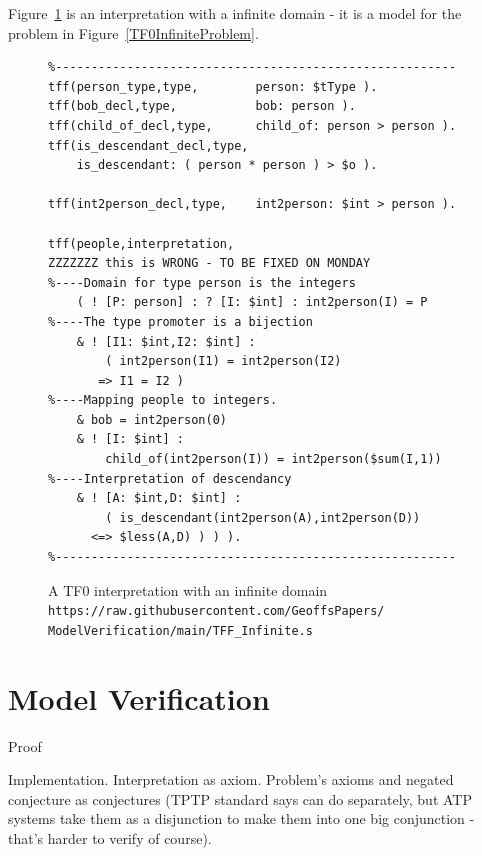 \documentclass[letterpaper]{article}
\begin{document}
Figure~\ref{TF0InfiniteInterpretation} is an interpretation with a infinite domain - it is a model 
for the problem in Figure~\ref{TF0InfiniteProblem}.

\begin{figure}[htbp]
\scriptsize
{}
\begin{verbatim}
%--------------------------------------------------------
tff(person_type,type,        person: $tType ).
tff(bob_decl,type,           bob: person ).
tff(child_of_decl,type,      child_of: person > person ).
tff(is_descendant_decl,type, 
    is_descendant: ( person * person ) > $o ).

tff(int2person_decl,type,    int2person: $int > person ).

tff(people,interpretation,
ZZZZZZZ this is WRONG - TO BE FIXED ON MONDAY
%----Domain for type person is the integers
    ( ! [P: person] : ? [I: $int] : int2person(I) = P
%----The type promoter is a bijection
    & ! [I1: $int,I2: $int] : 
        ( int2person(I1) = int2person(I2) 
       => I1 = I2 )
%----Mapping people to integers. 
    & bob = int2person(0)
    & ! [I: $int] : 
        child_of(int2person(I)) = int2person($sum(I,1))
%----Interpretation of descendancy
    & ! [A: $int,D: $int] : 
        ( is_descendant(int2person(A),int2person(D)) 
      <=> $less(A,D) ) ) ).
%--------------------------------------------------------
\end{verbatim}
\caption{A TF0 interpretation with an infinite domain\\
{\scriptsize {\tt https://raw.githubusercontent.com/GeoffsPapers/\\
ModelVerification/main/TFF\_Infinite.s}}}
\label{TF0InfiniteInterpretation}
\end{figure}


\section{Model Verification}
\label{Verification}

Proof

Implementation.
Interpretation as axiom.
Problem's axioms and negated conjecture as conjectures (TPTP standard says can do separately,
but ATP systems take them as a disjunction to make them into one big conjunction - that's
harder to verify of course).
\end{document}
